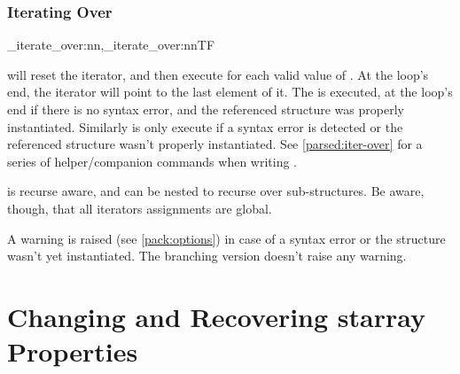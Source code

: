 \documentclass[10pt]{article}
\begin{document}
\subsubsection{Iterating Over}
\begin{codedescribe}[code,new=2023/11/04,update=2026/02/01]{\starray_iterate_over:nn,\starray_iterate_over:nnTF}
\begin{codesyntax}%
\end{codesyntax}
 will reset the  iterator, and then execute  for each valid value of . At the loop's end, the  iterator will point to the last element of it. The  is executed, at the loop's end if there is no syntax error, and the referenced structure was properly instantiated. Similarly  is only execute if a syntax error is detected or the referenced structure wasn't properly instantiated. See \ref{parsed:iter-over} for a series of helper/companion commands when writing .
\end{codedescribe} \label{iterate-over}
\begin{tsremark}
 is recurse aware, and can be nested to recurse over sub-structures. Be aware, though,  that all iterators assignments are global. \end{tsremark}
\begin{tsremark}
A warning is raised (see \ref{pack:options}) in case of a  syntax error or the structure wasn't yet instantiated. The branching version doesn't raise any warning.
\end{tsremark}



\section{Changing and Recovering starray Properties}\label{pack:get/set}
\end{document}
